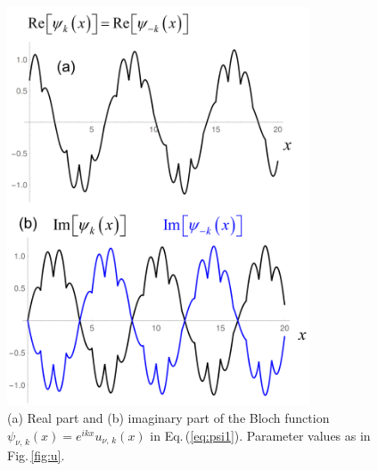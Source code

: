 \begin{figure}
    \includegraphics[width=0.8\textwidth, keepaspectratio]{figures/system/psi.png}
    \caption{(a) Real part and (b) imaginary part of the Bloch function 
    $\psi_{\nu,\,k}(x) = e^{i k x} u_{\nu,\,k}(x)$ in Eq.\,(\ref{eq:psi1}). 
    Parameter values as in Fig.\,\ref{fig:u}.}  
    \label{fig:psi}
\end{figure}

